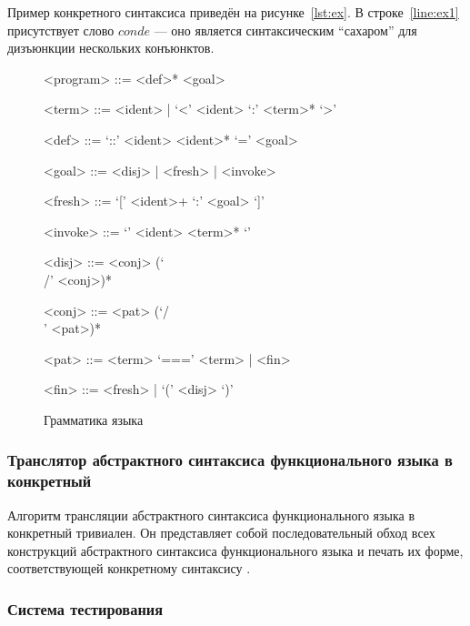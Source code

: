 Пример конкретного синтаксиса приведён на рисунке~\ref{lst:ex}.
В строке~\ref{line:ex1} присутствует слово $conde$ --- оно является синтаксическим ``сахаром'' для дизъюнкции нескольких конъюнктов.

\begin{figure}[h!]
  \begin{center}
    \begin{boxedminipage}{\linewidth}
    <program> ::= <def>* <goal>

    <term> ::= <ident> | `<' <ident> `:' <term>* `>'

    <def> ::= `::' <ident> <ident>* `=' <goal>

    <goal> ::= <disj> | <fresh> | <invoke>

    <fresh> ::= `[' <ident>+ `:' <goal> `]'

    <invoke> ::= `{' <ident> <term>* `}'

    <disj> ::= <conj> (`\\/' <conj>)*

    <conj> ::= <pat> (`/\\' <pat>)*

    <pat> ::= <term> `===' <term> | <fin>

    <fin> ::= <fresh> | `(' <disj> `)'
    \end{boxedminipage}
  \end{center}
  \caption{Грамматика языка \miniKanren{}}
  \label{mk:grammar}
\end{figure}


\subsubsection{Транслятор абстрактного синтаксиса функционального языка в конкретный}

Алгоритм трансляции абстрактного синтаксиса функционального языка в конкретный тривиален.
Он представляет собой последовательный обход всех конструкций абстрактного синтаксиса функционального языка и печать их форме, соответствующей конкретному синтаксису \haskell{}.


\subsubsection{Система тестирования}

